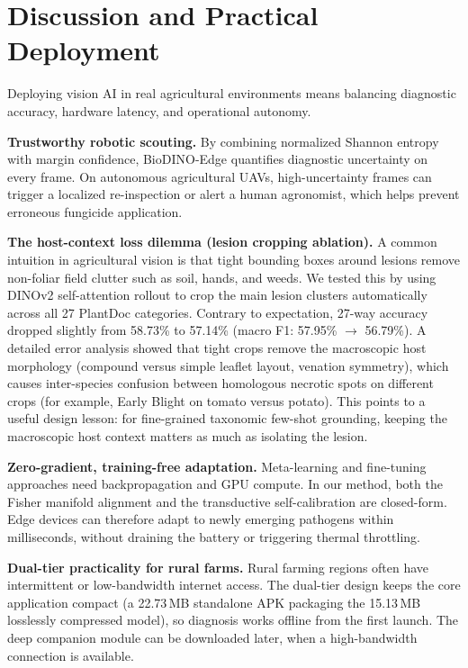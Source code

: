 \documentclass[conference]{IEEEtran}
\begin{document}
\section{Discussion and Practical Deployment}
Deploying vision AI in real agricultural environments means balancing diagnostic accuracy, hardware latency, and operational autonomy.

\textbf{Trustworthy robotic scouting.} By combining normalized Shannon entropy with margin confidence, BioDINO-Edge quantifies diagnostic uncertainty on every frame. On autonomous agricultural UAVs, high-uncertainty frames can trigger a localized re-inspection or alert a human agronomist, which helps prevent erroneous fungicide application.

\textbf{The host-context loss dilemma (lesion cropping ablation).} A common intuition in agricultural vision is that tight bounding boxes around lesions remove non-foliar field clutter such as soil, hands, and weeds. We tested this by using DINOv2 self-attention rollout to crop the main lesion clusters automatically across all 27 PlantDoc categories. Contrary to expectation, 27-way accuracy dropped slightly from 58.73\% to 57.14\% (macro F1: 57.95\% $\to$ 56.79\%). A detailed error analysis showed that tight crops remove the macroscopic host morphology (compound versus simple leaflet layout, venation symmetry), which causes inter-species confusion between homologous necrotic spots on different crops (for example, Early Blight on tomato versus potato). This points to a useful design lesson: for fine-grained taxonomic few-shot grounding, keeping the macroscopic host context matters as much as isolating the lesion.

\textbf{Zero-gradient, training-free adaptation.} Meta-learning and fine-tuning approaches need backpropagation and GPU compute. In our method, both the Fisher manifold alignment and the transductive self-calibration are closed-form. Edge devices can therefore adapt to newly emerging pathogens within milliseconds, without draining the battery or triggering thermal throttling.

\textbf{Dual-tier practicality for rural farms.} Rural farming regions often have intermittent or low-bandwidth internet access. The dual-tier design keeps the core application compact (a 22.73\,MB standalone APK packaging the 15.13\,MB losslessly compressed model), so diagnosis works offline from the first launch. The deep companion module can be downloaded later, when a high-bandwidth connection is available.
\end{document}
